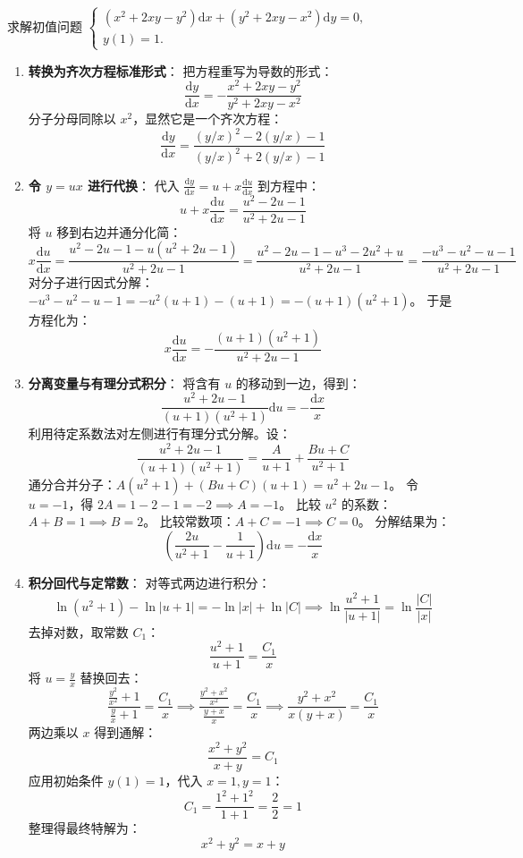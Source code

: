 \documentclass[lang=cn,11pt]{elegantbook}
\begin{document}
\begin{exercise}
求解初值问题
$\begin{cases}(x^2+2xy-y^2)\mathrm{d}x+(y^2+2xy-x^2)\mathrm{d}y=0,\\ y(1)=1.\end{cases}$
\end{exercise}
\begin{solution}
\begin{enumerate}
    \item \textbf{转换为齐次方程标准形式}：
    把方程重写为导数的形式：
    \[
    \frac{\mathrm{d}y}{\mathrm{d}x} = -\frac{x^2+2xy-y^2}{y^2+2xy-x^2}
    \]
    分子分母同除以 $x^2$，显然它是一个齐次方程：
    \[
    \frac{\mathrm{d}y}{\mathrm{d}x} = \frac{(y/x)^2 - 2(y/x) - 1}{(y/x)^2 + 2(y/x) - 1}
    \]
    \item \textbf{令 $y=ux$ 进行代换}：
    代入 $\frac{\mathrm{d}y}{\mathrm{d}x} = u + x\frac{\mathrm{d}u}{\mathrm{d}x}$ 到方程中：
    \[
    u + x\frac{\mathrm{d}u}{\mathrm{d}x} = \frac{u^2-2u-1}{u^2+2u-1}
    \]
    将 $u$ 移到右边并通分化简：
    \[
    x\frac{\mathrm{d}u}{\mathrm{d}x} = \frac{u^2-2u-1 - u(u^2+2u-1)}{u^2+2u-1} = \frac{u^2-2u-1 - u^3-2u^2+u}{u^2+2u-1} = \frac{-u^3-u^2-u-1}{u^2+2u-1}
    \]
    对分子进行因式分解：$-u^3-u^2-u-1 = -u^2(u+1) - (u+1) = -(u+1)(u^2+1)$。
    于是方程化为：
    \[
    x\frac{\mathrm{d}u}{\mathrm{d}x} = -\frac{(u+1)(u^2+1)}{u^2+2u-1}
    \]
    \item \textbf{分离变量与有理分式积分}：
    将含有 $u$ 的移动到一边，得到：
    \[
    \frac{u^2+2u-1}{(u+1)(u^2+1)}\mathrm{d}u = -\frac{\mathrm{d}x}{x}
    \]
    利用待定系数法对左侧进行有理分式分解。设：
    \[
    \frac{u^2+2u-1}{(u+1)(u^2+1)} = \frac{A}{u+1} + \frac{Bu+C}{u^2+1}
    \]
    通分合并分子：$A(u^2+1) + (Bu+C)(u+1) = u^2+2u-1$。
    令 $u=-1$，得 $2A = 1-2-1 = -2 \implies A=-1$。
    比较 $u^2$ 的系数：$A+B=1 \implies B=2$。
    比较常数项：$A+C=-1 \implies C=0$。
    分解结果为：
    \[
    \left(\frac{2u}{u^2+1} - \frac{1}{u+1}\right)\mathrm{d}u = -\frac{\mathrm{d}x}{x}
    \]
    \item \textbf{积分回代与定常数}：
    对等式两边进行积分：
    \[
    \ln(u^2+1) - \ln|u+1| = -\ln|x| + \ln|C| \implies \ln\frac{u^2+1}{|u+1|} = \ln\frac{|C|}{|x|}
    \]
    去掉对数，取常数 $C_1$：
    \[
    \frac{u^2+1}{u+1} = \frac{C_1}{x}
    \]
    将 $u = \frac{y}{x}$ 替换回去：
    \[
    \frac{\frac{y^2}{x^2}+1}{\frac{y}{x}+1} = \frac{C_1}{x} \implies \frac{\frac{y^2+x^2}{x^2}}{\frac{y+x}{x}} = \frac{C_1}{x} \implies \frac{y^2+x^2}{x(y+x)} = \frac{C_1}{x}
    \]
    两边乘以 $x$ 得到通解：
    \[
    \frac{x^2+y^2}{x+y} = C_1
    \]
    应用初始条件 $y(1)=1$，代入 $x=1, y=1$：
    \[
    C_1 = \frac{1^2+1^2}{1+1} = \frac{2}{2} = 1
    \]
    整理得最终特解为：
    \[
    \boxed{x^{2}+y^{2}=x+y}
    \]
\end{enumerate}
\end{solution}
\end{document}
